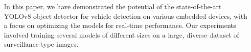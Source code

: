 






In this paper, we have demonstrated the potential of the state-of-the-art YOLOv8
object detector for vehicle detection on various embedded devices, with a focus
on optimizing the models for real-time performance. Our experiments involved
training several models of different sizes on a large, diverse dataset of
surveillance-type images.

